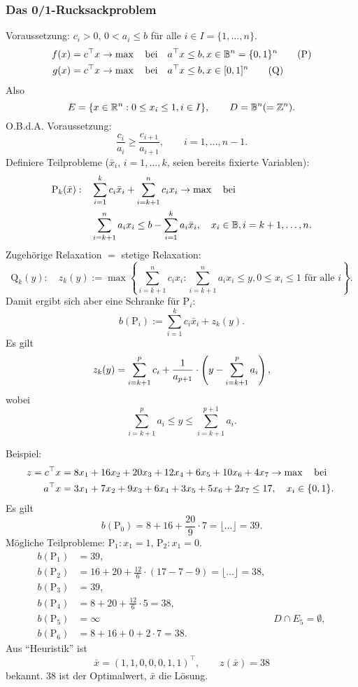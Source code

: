 \subsubsection{Das 0/1-Rucksackproblem}
Voraussetzung: $c_i > 0$, $0 < a_i \le b$ für alle $i \in I = \{ 1, \ldots, n
\}$. 
\begin{align*}
  f(x) &= c^\top x \to \max \quad \text{bei} \quad a^\top x \le b, 
         x \in \mathbb{B}^n = \{0,1\}^n \tag{P} \\
  g(x) &= c^\top x \to \max \quad \text{bei} \quad a^\top x \le b, 
         x \in [0,1]^n \tag{Q}
\end{align*}
Also
\[ E = \{ x \in \mathbb{R}^n : 0 \le x_i \le 1, i \in I \}, \qquad D = \mathbb{B}^n
  (=\mathbb{Z}^n). \]
O.B.d.A. Voraussetzung:
\[ \frac{c_i}{a_i} \ge \frac{c_{i+1}}{a_{i+1}}, \qquad i = 1, \ldots, n-1. \]
Definiere Teilprobleme ($\bar{x}_i$, $i = 1, \ldots, k$, seien bereits
fixierte Variablen):
\[ \begin{aligned}
    \text{P}_k(\bar{x}) : \quad
    &\sum_{i=1}^k c_i \bar{x}_i + \sum_{i=k+1}^n c_i x_i \to \max \quad \text{bei} \quad \\
    &\sum_{i=k+1}^n a_i x_i \le b - \sum_{i=1}^k a_i \bar{x}_i,
    \quad x_i \in \mathbb{B}, i = k+1, \ldots, n.
  \end{aligned}
\]
Zugehörige Relaxation $=$ stetige Relaxation:
\[ \text{Q}_k(y) : \quad
  z_k(y) := \max \left\{ \sum_{i=k+1}^n c_i x_i : \sum_{i=k+1}^n a_i x_i \le
    y, 0 \le x_i \le 1 \text{ für alle } i \right\}. \]
Damit ergibt sich aber eine Schranke für $\text{P}_i$:
\[ b( \text{P}_i ) := \sum_{i=1}^k c_i \bar{x}_i + z_k(y). \]
Es gilt
\[ z_k(y) = \sum_{i=k+1}^p c_i + \frac{1}{a_{p+1}} \cdot \left( y - \sum_{i=k+1}^p
    a_i \right), \]
wobei
\[ \sum_{i=k+1}^p a_i \le y \le \sum_{i=k+1}^{p+1} a_i. \]

\begin{exmp}
  Beispiel:
  \[ \begin{aligned}
      z = c^\top x &= 8x_1 + 16x_2 + 20x_3 + 12x_4 + 6 x_5 + 10x_6 + 4x_7 \to
      \max \quad \text{bei} \quad \\
      a^\top x &= 3x_1 + 7x_2 + 9x_3 + 6x_4 + 3x_5 + 5x_6 + 2x_7 \le 17, \quad
      x_i \in \{0,1\}.
    \end{aligned}
  \]
  Es gilt
  \[ b(\text{P}_0) = 8 + 16 + \frac{20}{9} \cdot 7 = \lfloor \ldots \rfloor =
    39. \]
  Mögliche Teilprobleme: $\text{P}_1 : x_1 = 1$, $\text{P}_2 : x_1 = 0$.
  \begin{align*}
    b(\text{P}_1) &= 39, \\
    b(\text{P}_2) &= 16 + 20 + \frac{12}{6} \cdot (17-7-9)
                    = \lfloor \ldots \rfloor = 38, \\
    b(\text{P}_3) &= 39, \\
    b(\text{P}_4) &= 8 + 20 + \frac{12}{6} \cdot 5 = 38, \\
    b(\text{P}_5) &= \infty & D \cap E_5 = \emptyset, \\
    b(\text{P}_6) &= 8 + 16 + 0 + 2 \cdot 7 = 38.
  \end{align*}
  Aus ``Heuristik'' ist
  \[ \bar{x} = (1,1,0,0,0,1,1)^\top, \qquad z(\bar{x}) = 38 \]
  bekannt. 38 ist der Optimalwert, $\bar{x}$ die Lösung.
\end{exmp}

